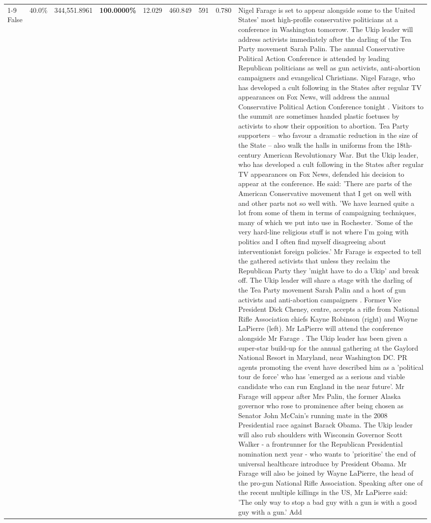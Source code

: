 \begin{table}[H]
\begin{tabular}{lllrlllll}
\cline{1-9}
False & 40.0\% & 344,551.8961 & \bfseries \color{red} 100.0000\% & 12.029 & 460.849 & 591 & 0.780 & Nigel Farage is set to appear alongside some to the United States' most high-profile conservative politicians at a conference in Washington tomorrow. The Ukip leader will address activists immediately after the darling of the Tea Party movement Sarah Palin. The annual Conservative Political Action Conference is attended by leading Republican politicians as well as gun activists, anti-abortion campaigners and evangelical Christians. Nigel Farage, who has developed a cult following in the States after regular TV appearances on Fox News, will address the annual Conservative Political Action Conference tonight . Visitors to the summit are sometimes handed plastic foetuses by activists to show their opposition to abortion. Tea Party supporters – who favour a dramatic reduction in the size of the State – also walk the halls in uniforms from the 18th-century American Revolutionary War. But the Ukip leader, who has developed a cult following in the States after regular TV appearances on Fox News, defended his decision to appear at the conference. He said: 'There are parts of the American Conservative movement that I get on well with and other parts not so well with. 'We have learned quite a lot from some of them in terms of campaigning techniques, many of which we put into use in Rochester. 'Some of the very hard-line religious stuff is not where I'm going with politics and I often find myself disagreeing about interventionist foreign policies.' Mr Farage is expected to tell the gathered activists that unless they reclaim the Republican Party they 'might have to do a Ukip' and break off. The Ukip leader will share a stage with the darling of the Tea Party movement Sarah Palin and a host of gun activists and anti-abortion campaigners . Former Vice President Dick Cheney, centre, accepts a rifle from National Rifle Association chiefs Kayne Robinson (right) and Wayne LaPierre (left). Mr LaPierre will attend the conference alongside Mr Farage . The Ukip leader has been given a super-star build-up for the annual gathering at the Gaylord National Resort in Maryland, near Washington DC. PR agents promoting the event have described him as a 'political tour de force' who has 'emerged as a serious and viable candidate who can run England in the near future'. Mr Farage will appear after Mrs Palin, the former Alaska governor who rose to prominence after being chosen as Senator John McCain's running mate in the 2008 Presidential race against Barack Obama. The Ukip leader will also rub shoulders with Wisconsin Governor Scott Walker - a frontrunner for the Republican Presidential nomination next year - who wants to 'prioritise' the end of universal healthcare introduce by President Obama. Mr Farage will also be joined by Wayne LaPierre, the head of the pro-gun National Rifle Association. Speaking after one of the recent multiple killings in the US, Mr LaPierre said: 'The only way to stop a bad guy with a gun is with a good guy with a gun.' Add \\

\end{tabular}
\end{table}
